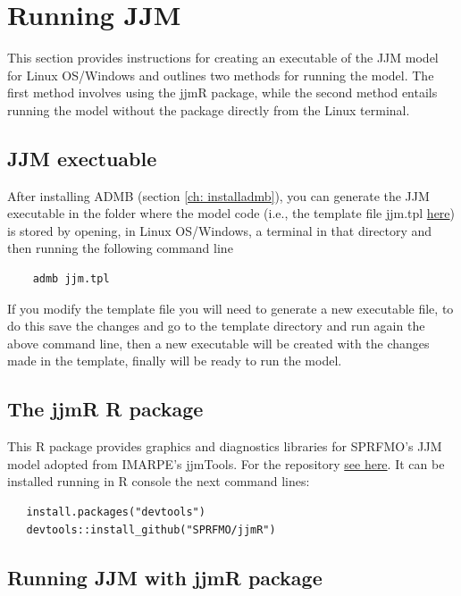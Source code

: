 \documentclass{article}
\begin{document}
\section{Running JJM}
This section provides instructions for creating an executable of the JJM model for Linux OS/Windows and outlines two methods for running the model. The first method involves using the jjmR package, while the second method entails running the model without the package directly from the Linux terminal. %

\subsection{JJM exectuable} \label{ch: jjmexec}
After installing ADMB (section \ref{ch: installadmb}), you can generate the JJM executable in the folder where the model code (i.e., the template file jjm.tpl \href{https://github.com/SPRFMO/jjm/blob/main/src/jjm.tpl}{here}) is stored by opening, in Linux OS/Windows,  a terminal in that directory  and then running the following command line
\begin{lstlisting}
    admb jjm.tpl 
\end{lstlisting}
If you modify the template file you will need to generate a new executable file, to do this save the changes and go to the template directory and run again the above command line, then a new executable will be created with the changes made in the template, finally will be ready to run the model.


\subsection{The jjmR R package}
This R package provides graphics and diagnostics libraries for SPRFMO’s JJM model adopted from IMARPE’s jjmTools. For the repository \href{https://github.com/SPRFMO/jjmr}{see here}. It can be 
installed running in R console the next command lines:
\begin{lstlisting}
   install.packages("devtools")
   devtools::install_github("SPRFMO/jjmR")
\end{lstlisting}
\subsection{Running JJM with jjmR package} \label{ch: runjjmr}
\end{document}
